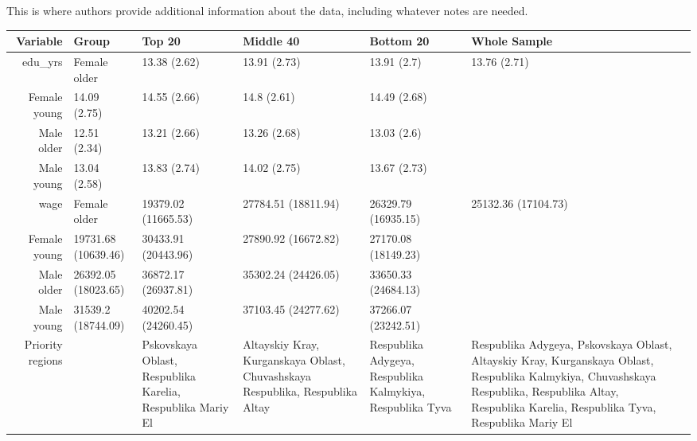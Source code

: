 \documentclass[a4paper,12pt,twoside]{book}
\begin{document}
\begin{table}[H]
\begin{tabular}{llllll}
		\hline
	\end{tabular}
    \begin{tablenotes}
	\small
	\item This is where authors provide additional information about
	the data, including whatever notes are needed.
\end{tablenotes}
\end{table}


\begin{table}[ht]
	\centering
	\begin{tabular}{rllllll}
		\hline
		Variable & Group & Top 20 & Middle 40 & Bottom 20 & Whole Sample \\ 
		\hline
		edu\_yrs & Female older & 13.38 (2.62) & 13.91 (2.73) & 13.91 (2.7) & 13.76 (2.71) \\ 
		Female young & 14.09 (2.75) & 14.55 (2.66) & 14.8 (2.61) & 14.49 (2.68) \\ 
		Male older & 12.51 (2.34) & 13.21 (2.66) & 13.26 (2.68) & 13.03 (2.6) \\ 
		Male young & 13.04 (2.58) & 13.83 (2.74) & 14.02 (2.75) & 13.67 (2.73) \\ 
		wage & Female older & 19379.02 (11665.53) & 27784.51 (18811.94) & 26329.79 (16935.15) & 25132.36 (17104.73) \\ 
		Female young & 19731.68 (10639.46) & 30433.91 (20443.96) & 27890.92 (16672.82) & 27170.08 (18149.23) \\ 
		Male older & 26392.05 (18023.65) & 36872.17 (26937.81) & 35302.24 (24426.05) & 33650.33 (24684.13) \\ 
		Male young & 31539.2 (18744.09) & 40202.54 (24260.45) & 37103.45 (24277.62) & 37266.07 (23242.51) \\ 
		Priority regions &  & Pskovskaya Oblast, Respublika Karelia, Respublika Mariy El & Altayskiy Kray, Kurganskaya Oblast, Chuvashskaya Respublika, Respublika Altay & Respublika Adygeya, Respublika Kalmykiya, Respublika Tyva & Respublika Adygeya, Pskovskaya Oblast, Altayskiy Kray, Kurganskaya Oblast, Respublika Kalmykiya, Chuvashskaya Respublika, Respublika Altay, Respublika Karelia, Respublika Tyva, Respublika Mariy El \\ 
		\hline
	\end{tabular}
\end{table}
\end{document}
